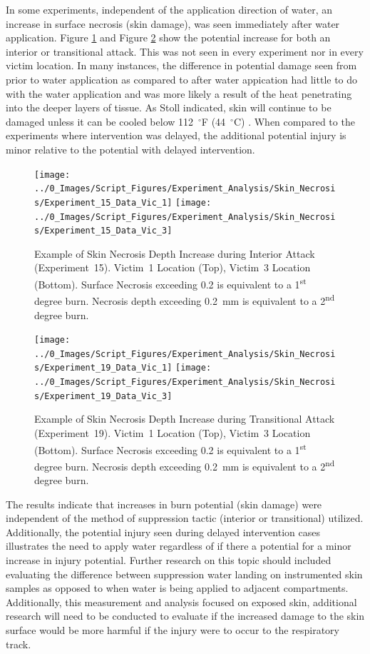\documentclass[12pt,oneside]{book}
\begin{document}
In some experiments, independent of the application direction of water, an increase in surface necrosis (skin damage), was seen immediately after water application. Figure \ref{fig:necrosis_increase_interior} and Figure \ref{fig:necrosis_increase_exterior} show the potential increase for both an interior or transitional attack. This was not seen in every experiment nor in every victim location. In many instances, the difference in potential damage seen from prior to water application as compared to after water appication had little to do with the water application and was more likely a result of the heat penetrating into the deeper layers of tissue.  As Stoll indicated, skin will continue to be damaged unless it can be cooled below 112~$^\circ$F (44~$^\circ$C) \cite{Pain_Thermal_Radiation}. When compared to the experiments where intervention was delayed, the additional potential injury is minor relative to the potential with delayed intervention. 

\begin{figure}[H]
\centering
\texttt{[image: ../0\_Images/Script\_Figures/Experiment\_Analysis/Skin\_Necrosis/Experiment\_15\_Data\_Vic\_1]}
\texttt{[image: ../0\_Images/Script\_Figures/Experiment\_Analysis/Skin\_Necrosis/Experiment\_15\_Data\_Vic\_3]}
\caption{Example of Skin Necrosis Depth Increase during Interior Attack (Experiment~15). Victim~1 Location (Top), Victim~3 Location (Bottom). Surface Necrosis exceeding 0.2 is equivalent to a 1\textsuperscript{st} degree burn. Necrosis depth exceeding 0.2~mm is equivalent to a 2\textsuperscript{nd} degree burn.}
\label{fig:necrosis_increase_interior}
\end{figure}

\begin{figure}[H]
\centering
\texttt{[image: ../0\_Images/Script\_Figures/Experiment\_Analysis/Skin\_Necrosis/Experiment\_19\_Data\_Vic\_1]}
\texttt{[image: ../0\_Images/Script\_Figures/Experiment\_Analysis/Skin\_Necrosis/Experiment\_19\_Data\_Vic\_3]}
\caption{Example of Skin Necrosis Depth Increase during Transitional Attack (Experiment~19). Victim~1 Location (Top), Victim~3 Location (Bottom). Surface Necrosis exceeding 0.2 is equivalent to a 1\textsuperscript{st} degree burn. Necrosis depth exceeding 0.2~mm is equivalent to a 2\textsuperscript{nd} degree burn.}
\label{fig:necrosis_increase_exterior}
\end{figure}

The results indicate that increases in burn potential (skin damage) were independent of the method of suppression tactic (interior or transitional) utilized. Additionally, the potential injury seen during delayed intervention cases illustrates the need to apply water regardless of if there a potential for a minor increase in injury potential.  Further research on this topic should included evaluating the difference between suppression water landing on instrumented skin samples as opposed to when water is being applied to adjacent compartments. Additionally, this measurement and analysis focused on exposed skin, additional research will need to be conducted to evaluate if the increased damage to the skin surface would be more harmful if the injury were to occur to the respiratory track. 
\end{document}
